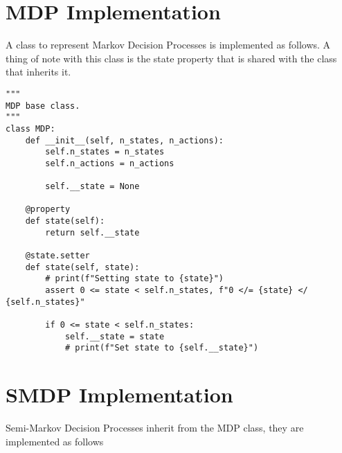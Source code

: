
\appendix

\chapter{MDP Implementation}

A class to represent Markov Decision Processes is implemented as follows. A thing of note with this class is the state property that is shared with the class that inherits it.

\begin{verbatim}
"""
MDP base class.
"""
class MDP:
    def __init__(self, n_states, n_actions):
        self.n_states = n_states
        self.n_actions = n_actions

        self.__state = None

    @property
    def state(self):
        return self.__state

    @state.setter
    def state(self, state):
        # print(f"Setting state to {state}")
        assert 0 <= state < self.n_states, f"0 </= {state} </ {self.n_states}"

        if 0 <= state < self.n_states:
            self.__state = state
            # print(f"Set state to {self.__state}")
\end{verbatim}

\chapter{SMDP Implementation}

Semi-Markov Decision Processes inherit from the MDP class, they are implemented as follows

